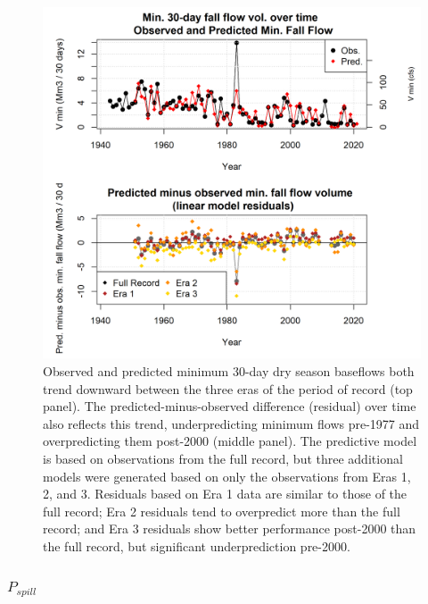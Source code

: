 \documentclass[hess, manuscript]{copernicus}
\begin{document}
\begin{figure}
\includegraphics[width=1\linewidth]{f13} \caption{\label{fig:v_min_over_time} Observed and predicted minimum 30-day dry season baseflows both trend downward between the three eras of the period of record (top panel). The predicted-minus-observed difference (residual) over time also reflects this trend, underpredicting minimum flows pre-1977 and overpredicting them post-2000 (middle panel). The predictive model is based on observations from the full record, but three additional models were generated based on only the observations from Eras 1, 2, and 3. Residuals based on Era 1 data are similar to those of the full record; Era 2 residuals tend to overpredict more than the full record; and Era 3 residuals show better performance post-2000 than the full record, but significant underprediction pre-2000.}\label{fig:v_min_over_time}
\end{figure}

\newpage

\subsubsection{\texorpdfstring{\(P_{spill}\)}{P\_\{spill\}}}
\end{document}
